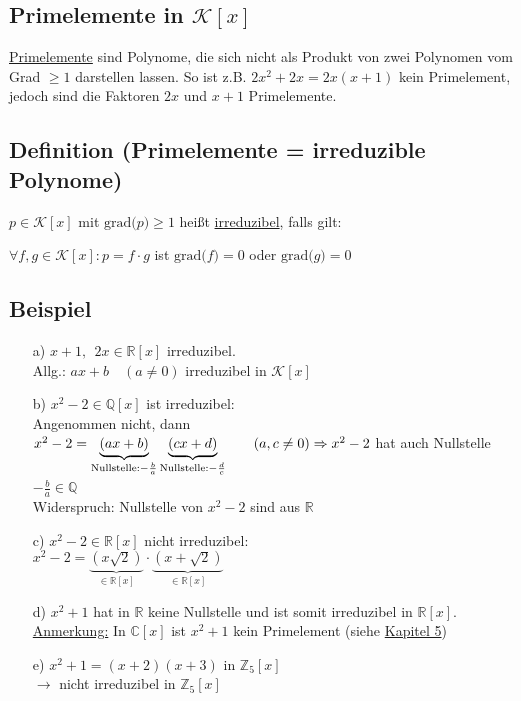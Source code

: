 \documentclass[12pt,titlepage, pdf]{article}
\newcommand{\grad}[1]{\textrm{grad(}#1\textrm{)}}
\newcommand{\R}{\mathds{R}}
\newcommand{\K}{\mathcal{K}}
\newcommand{\uline}[1]{\underline{#1}}
\renewcommand{\>}{\rightarrow}
\renewcommand{\*}{\cdot}
\begin{document}
\subsection*{Primelemente in $\K[x]$}
\uline{Primelemente} sind Polynome, die sich nicht als Produkt von zwei Polynomen vom Grad $\geq 1$ darstellen lassen. So ist z.B. $2x^2 + 2x = 2x(x+1)$ kein Primelement, jedoch sind die Faktoren $2x$ und $x+1$ Primelemente.
\subsection{Definition (Primelemente = irreduzible Polynome)}
$p \in \K[x]$ mit $\grad{p}\geq 1$ heißt \uline{irreduzibel}, falls gilt: 
\begin{center}
	$\forall f,g \in \K[x]: p = f \cdot g$ ist $\grad{f} = 0$ oder $\grad{g} = 0$
\end{center}
\subsection{Beispiel}
\begin{itemize}
	\item[a)]
	$x+1,~~ 2x \in \R[x]$ irreduzibel.\\
	Allg.: $ax +b \quad (a\neq 0)$ irreduzibel in $\K[x]$
	\item[b)]
	$x^2 - 2 \in \mathbb{Q}[x]$ ist irreduzibel: \\
	Angenommen nicht, dann $x^2 - 2 = \underbrace{(ax + b)}_{\text{Nullstelle:} -\frac{b}{a}} \underbrace{(cx+d)}_{\text{Nullstelle:} -\frac{d}{c}}\qquad(a,c\neq0) \\
	\Rightarrow x^2 -2$ hat auch Nullstelle $-\frac{b}{a} \in \mathbb{Q}$~\Lightning\\
	Widerspruch: Nullstelle von $x^2 -2$ sind aus $\R$
	\item[c)] $x^2 -2 \in \R[x]$ nicht irreduzibel: \\
	$x^2 - 2 = \underbrace{(x\sqrt{2})}_{\in \R[x]} \cdot \underbrace{(x+\sqrt{2})}_{\in \R[x]}$
	\item[d)] $x^2+1$ hat in $\R$ keine Nullstelle und ist somit irreduzibel in $\R[x]$. \\
	\uline{Anmerkung:} In $\mathbb{C}[x]$ ist $x^2 +1$ kein Primelement (siehe \hyperref[5]{Kapitel 5})
	\item[e)]
	$x^2 +1 = (x+2)(x+3)$ in $\mathbb{Z}_5[x]$\\
	$\rightarrow$ nicht irreduzibel in $\mathbb{Z}_5[x]$ 
\end{itemize}
\end{document}
